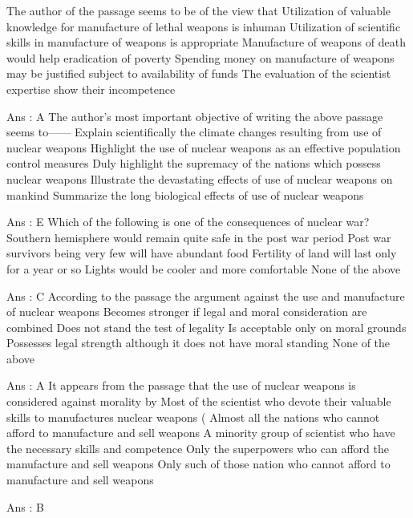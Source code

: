     The author of the passage seems to be of the view that
        Utilization of valuable knowledge for manufacture of lethal weapons is inhuman
        Utilization of scientific skills in manufacture of weapons is appropriate
        Manufacture of weapons of death would help eradication of poverty
        Spending money on manufacture of weapons may be justified subject to availability of funds
        The evaluation of the scientist expertise show their incompetence 

    Ans : A
    The author’s most important objective of writing the above passage seems to------
        Explain scientifically the climate changes resulting from use of nuclear weapons
        Highlight the use of nuclear weapons as an effective population control measures
        Duly highlight the supremacy of the nations which possess nuclear weapons
        Illustrate the devastating effects of use of nuclear weapons on mankind
        Summarize the long biological effects of use of nuclear weapons 

    Ans : E
    Which of the following is one of the consequences of nuclear war?
        Southern hemisphere would remain quite safe in the post war period
        Post war survivors being very few will have abundant food
        Fertility of land will last only for a year or so
        Lights would be cooler and more comfortable
        None of the above 

    Ans : C
    According to the passage the argument against the use and manufacture of nuclear weapons
        Becomes stronger if legal and moral consideration are combined
        Does not stand the test of legality
        Is acceptable only on moral grounds
        Possesses legal strength although it does not have moral standing
        None of the above 

    Ans : A
    It appears from the passage that the use of nuclear weapons is considered against morality by
        Most of the scientist who devote their valuable skills to manufactures nuclear weapons (
        Almost all the nations who cannot afford to manufacture and sell weapons
        A minority group of scientist who have the necessary skills and competence
        Only the superpowers who can afford the manufacture and sell weapons
        Only such of those nation who cannot afford to manufacture and sell weapons 

    Ans : B 


